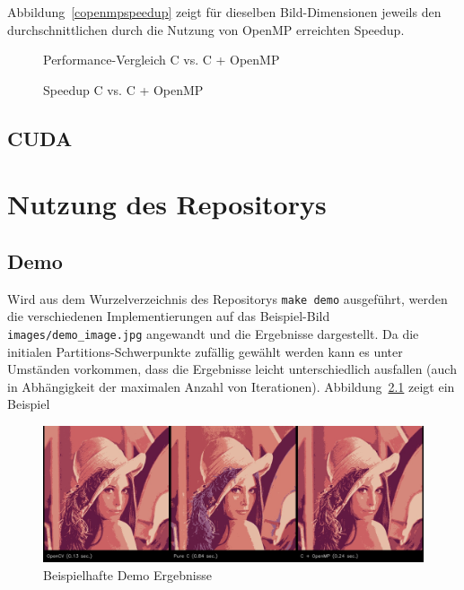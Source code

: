 \documentclass[
    bibliography=totoc, cd=lightcolor, cdmath=false, ngerman]{tudscrreprt}
\begin{document}
Abbildung~\ref{copenmpspeedup} zeigt für dieselben Bild-Dimensionen jeweils den
durchschnittlichen durch die Nutzung von OpenMP erreichten Speedup.

\begin{figure}[h]
\centering

\caption{Performance-Vergleich C vs. C + OpenMP}
\label{img:copenmpboxplot}
\end{figure}

\begin{figure}[h]
\centering

\caption{Speedup C vs. C + OpenMP}
\label{img:copenmpspeedup}
\end{figure}

\section{CUDA}

\chapter{Nutzung des Repositorys}

\section{Demo}

Wird aus dem Wurzelverzeichnis des Repositorys \texttt{make demo} ausgeführt,
werden die verschiedenen Implementierungen auf das Beispiel-Bild
\texttt{images/demo\_image.jpg} angewandt und die Ergebnisse dargestellt. Da
die initialen Partitions-Schwerpunkte zufällig gewählt werden kann es unter
Umständen vorkommen, dass die Ergebnisse leicht unterschiedlich ausfallen
(auch in Abhängigkeit der maximalen Anzahl von Iterationen).
Abbildung~\ref{img:demoresults} zeigt ein Beispiel

\begin{figure}[h]
\centering
\includegraphics[width=\textwidth]{report/resources/demo_results.jpg}
\caption{Beispielhafte Demo Ergebnisse}
\label{img:demoresults}
\end{figure}
\end{document}
